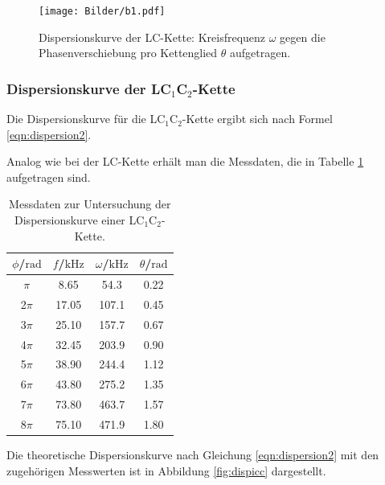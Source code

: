 \begin{figure}
	\centering
	\texttt{[image: Bilder/b1.pdf]}
	\caption{Dispersionskurve der LC-Kette: Kreisfrequenz $\omega$ gegen die Phasenverschiebung pro Kettenglied $\theta$ aufgetragen.}
	\label{fig:dispilc}
\end{figure}

\FloatBarrier
\subsubsection{Dispersionskurve der LC$_1$C$_2$-Kette}
Die Dispersionskurve für die LC$_1$C$_2$-Kette ergibt sich nach Formel \eqref{eqn:dispersion2}.

Analog wie bei der LC-Kette erhält man die Messdaten, die in Tabelle \ref{tab:dispersioncc}
aufgetragen sind.

\begin{table}
	\caption{Messdaten zur Untersuchung der Dispersionskurve einer LC$_1$C$_2$-Kette.}
	\label{tab:dispersioncc}
	\centering
	\begin{tabular}{cccc}
		\toprule
		$\phi$/$\si{\radian}$ & $f$/$\si{\kilo\Hz}$ & $\omega$/$\si{\kilo\Hz}$ & $\theta$/$\si{\radian}$ \\
		\midrule
		$\pi$                 & 8.65                & 54.3                     & 0.22                    \\
		2$\pi$                & 17.05               & 107.1                    & 0.45                    \\
		3$\pi$                & 25.10               & 157.7                    & 0.67                    \\
		4$\pi$                & 32.45               & 203.9                    & 0.90                    \\
		5$\pi$                & 38.90               & 244.4                    & 1.12                    \\
		6$\pi$                & 43.80               & 275.2                    & 1.35                    \\
		7$\pi$                & 73.80               & 463.7                    & 1.57                    \\
		8$\pi$                & 75.10               & 471.9                    & 1.80                    \\
		\bottomrule
	\end{tabular}
\end{table}

Die theoretische Dispersionskurve nach Gleichung \eqref{eqn:dispersion2} mit den zugehörigen Messwerten ist in Abbildung \ref{fig:dispicc} dargestellt.

